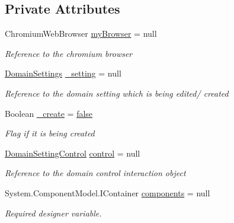 \subsection*{Private Attributes}
\begin{DoxyCompactItemize}
\item 
Chromium\+Web\+Browser \hyperlink{class_web_analyzer_1_1_u_i_1_1_edit_domain_setting_form_abfd63dc104e7aeb07ba7aec98cc9356c}{my\+Browser} = null
\begin{DoxyCompactList}\small\item\em Reference to the chromium browser \end{DoxyCompactList}\item 
\hyperlink{class_web_analyzer_1_1_models_1_1_settings_model_1_1_domain_settings}{Domain\+Settings} \hyperlink{class_web_analyzer_1_1_u_i_1_1_edit_domain_setting_form_a71be683a36cece3d304f173303b4fc98}{\+\_\+setting} = null
\begin{DoxyCompactList}\small\item\em Reference to the domain setting which is being edited/ created \end{DoxyCompactList}\item 
Boolean \hyperlink{class_web_analyzer_1_1_u_i_1_1_edit_domain_setting_form_a6d29a5eb0158140002b179655b5d6145}{\+\_\+create} = \hyperlink{_u_i_2_h_t_m_l_resources_2js_2src_2export_8js_ae6c865df784842196d411c1466b01686}{false}
\begin{DoxyCompactList}\small\item\em Flag if it is being created \end{DoxyCompactList}\item 
\hyperlink{class_web_analyzer_1_1_u_i_1_1_interaction_objects_1_1_domain_setting_control}{Domain\+Setting\+Control} \hyperlink{class_web_analyzer_1_1_u_i_1_1_edit_domain_setting_form_a37601f0104b9dec1703687fa74d4c32d}{control} = null
\begin{DoxyCompactList}\small\item\em Reference to the domain control interaction object \end{DoxyCompactList}\item 
System.\+Component\+Model.\+I\+Container \hyperlink{class_web_analyzer_1_1_u_i_1_1_edit_domain_setting_form_af2e698f2728b4d6bd25a12076c549be3}{components} = null
\begin{DoxyCompactList}\small\item\em Required designer variable. \end{DoxyCompactList}\end{DoxyCompactItemize}


